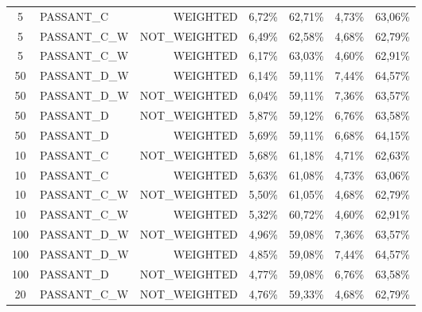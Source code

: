 \begin{table}[H]
{\begin{tabular}{ c l r c c c c }
			5 &  PASSANT\_C &   WEIGHTED &     6,72\% &    62,71\% &     4,73\% &    63,06\% \\
			
			5 & PASSANT\_C\_W & NOT\_WEIGHTED &     6,49\% &    62,58\% &     4,68\% &    62,79\% \\
			
			5 & PASSANT\_C\_W &   WEIGHTED &     6,17\% &    63,03\% &     4,60\% &    62,91\% \\
			
			50 & PASSANT\_D\_W &   WEIGHTED &     6,14\% &    59,11\% &     7,44\% &    64,57\% \\
			
			50 & PASSANT\_D\_W & NOT\_WEIGHTED &     6,04\% &    59,11\% &     7,36\% &    63,57\% \\
			
			50 &  PASSANT\_D & NOT\_WEIGHTED &     5,87\% &    59,12\% &     6,76\% &    63,58\% \\
			
			50 &  PASSANT\_D &   WEIGHTED &     5,69\% &    59,11\% &     6,68\% &    64,15\% \\
			
			10 &  PASSANT\_C & NOT\_WEIGHTED &     5,68\% &    61,18\% &     4,71\% &    62,63\% \\
			
			10 &  PASSANT\_C &   WEIGHTED &     5,63\% &    61,08\% &     4,73\% &    63,06\% \\
			
			10 & PASSANT\_C\_W & NOT\_WEIGHTED &     5,50\% &    61,05\% &     4,68\% &    62,79\% \\
			
			10 & PASSANT\_C\_W &   WEIGHTED &     5,32\% &    60,72\% &     4,60\% &    62,91\% \\
			
			100 & PASSANT\_D\_W & NOT\_WEIGHTED &     4,96\% &    59,08\% &     7,36\% &    63,57\% \\
			
			100 & PASSANT\_D\_W &   WEIGHTED &     4,85\% &    59,08\% &     7,44\% &    64,57\% \\
			
			100 &  PASSANT\_D & NOT\_WEIGHTED &     4,77\% &    59,08\% &     6,76\% &    63,58\% \\
			
			20 & PASSANT\_C\_W & NOT\_WEIGHTED &     4,76\% &    59,33\% &     4,68\% &    62,79\% \\
			

\end{tabular}}
\end{table}
